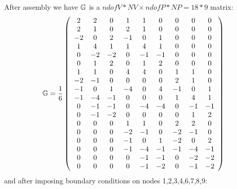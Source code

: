 After assembly we have ${\mathbb{G}}$ is a $ndofV*NV\times ndofP*NP=18*9$ matrix:
\[
{\mathbb{G}}=
\frac{1}{6}
\left(
\begin{array}{ccccccccc}
  2  &   2 &   0 &   1 &   1 &    0 &   0 &   0 &   0 \\ 
  2  &   1 &   0 &   2 &   1 &    0 &   0 &   0 &   0 \\ 
 -2  &   0 &   2 &  -1 &   0 &    1 &   0 &   0 &   0 \\ 
  1  &   4 &   1 &   1 &   4 &    1 &   0 &   0 &   0 \\ 
  0  &  -2 &  -2 &   0 &  -1 &   -1 &   0 &   0 &   0 \\ 
  0  &   1 &   2 &   0 &   1 &    2 &   0 &   0 &   0 \\ 
  1  &   1 &   0 &   4 &   4 &    0 &   1 &   1 &   0 \\ 
 -2  &  -1 &   0 &   0 &   0 &    0 &   2 &   1 &   0 \\ 
 -1  &   0 &   1 &  -4 &   0 &    4 &  -1 &   0 &   1 \\ 
 -1  &  -4 &  -1 &   0 &   0 &    0 &   1 &   4 &   1 \\ 
  0  &  -1 &  -1 &   0 &  -4 &   -4 &   0 &  -1 &  -1 \\ 
  0  &  -1 &  -2 &   0 &   0 &    0 &   0 &   1 &   2 \\ 
  0  &   0 &   0 &   1 &   1 &    0 &   2 &   2 &   0 \\ 
  0  &   0 &   0 &  -2 &  -1 &    0 &  -2 &  -1 &   0 \\ 
  0  &   0 &   0 &  -1 &   0 &    1 &  -2 &   0 &   2 \\ 
  0  &   0 &   0 &  -1 &  -4 &   -1 &  -1 &  -4 &  -1 \\ 
  0  &   0 &   0 &   0 &  -1 &   -1 &   0 &  -2 &  -2 \\ 
  0  &   0 &   0 &   0 &  -1 &   -2 &   0 &  -1 &  -2 
\end{array}
\right)
\]
and after imposing boundary conditions on nodes 1,2,3,4,6,7,8,9:
